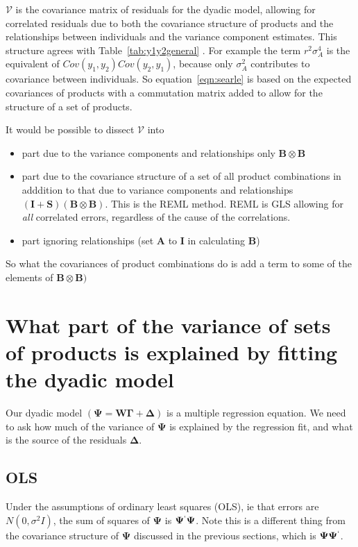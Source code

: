 \documentclass[titlepage,a4paper,12pt]{article}  %
\begin{document}
$\bm{\mathcal{V}}$ is the covariance matrix of residuals for the dyadic model, allowing for correlated residuals due to both the covariance structure of products and  the relationships between individuals and the variance component estimates.
 This structure agrees with Table~\ref{tab:y1y2general} . For example the term $r^{2}\sigma_{A}^{4}$ is the equivalent of $Cov(y_{1},y_{2})Cov(y_{2},y_{1})$, because only $\sigma^{2}_{A}$ contributes to covariance between individuals. So equation~\ref{eqn:searle} is based on the expected covariances of products with a commutation matrix added to allow for the structure of a set of products.

It would be possible to dissect $\bm{\mathcal{V}}$ into 
\begin{itemize}
\item part due to the variance components and relationships only $\bm{B} \otimes \bm{B}$
\item part due to the covariance structure of a set of all product combinations  in adddition to that due to variance components and relationships $(\bm{I} + \bm{S})(\bm{B} \otimes \bm{B}) $. This is the REML method. REML is GLS allowing for {\em all} correlated errors, regardless of the cause of the correlations.
\item part ignoring relationships (set $\bm{A}$ to $\bm{I}$ in calculating $\bm{B}$)
\end{itemize}
 
So what the covariances of product combinations do is add a  term  to some of the elements of $\bm{B} \otimes  \bm{B})$




\section{What part of the variance of sets of products is explained by fitting the dyadic model}


Our dyadic model $(\bm{\Psi} = \bm{W} \bm{\Gamma} + \bm{\Delta})$ is a multiple regression equation. We need to ask how much of the variance of $\bm{\Psi}$ is explained by the regression fit, and what is the source of the residuals $\bm{\Delta}$. 

\subsection{OLS}

Under the assumptions of ordinary least squares (OLS), ie that errors are $N(0,\sigma^{2}I)$,
the sum of squares of $\bm{\Psi}$ is $\bm{\Psi}^{`}\bm{\Psi}$. Note this is a different thing from the covariance structure of $\bm{\Psi}$ discussed in the previous sections, which is $\bm{\Psi}\bm{\Psi}^{`}$. 
\end{document}
